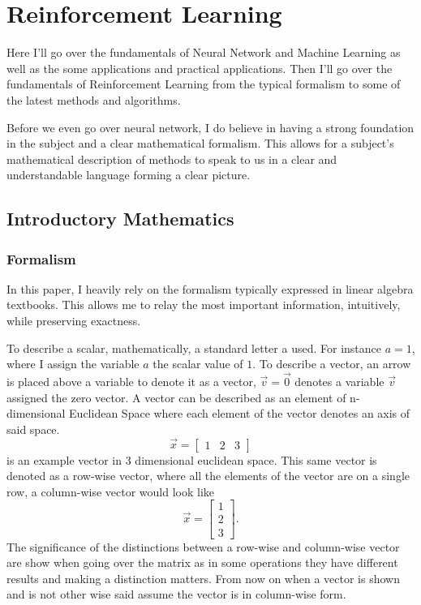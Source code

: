 \chapter{Reinforcement Learning}\label{ch:RL}

Here I'll go over the fundamentals of Neural Network and Machine Learning as well as the some applications and practical applications. Then I'll go over the fundamentals of Reinforcement Learning from the typical formalism to some of the latest methods and algorithms.

Before we even go over neural network, I do believe in having a strong foundation in the subject and a clear mathematical formalism. This allows for a subject's mathematical description of methods to speak to us in a clear and understandable language forming a clear picture.

\section{Introductory Mathematics}

\subsection{Formalism}

In this paper, I heavily rely on the formalism typically expressed in linear algebra textbooks. This allows me to relay the most important information, intuitively, while preserving exactness.

To describe a scalar, mathematically, a standard letter a used. For instance $a=1$, where I assign the variable $a$ the scalar value of $1$. To describe a vector, an arrow is placed above a variable to denote it as a vector, $\vec{v}=\vec{0}$ denotes a variable $\vec{v}$ assigned the zero vector. A vector can be described as an element of n-dimensional Euclidean Space where each element of the vector denotes an axis of said space. $$\vec{x}=\begin{bmatrix}1 & 2 & 3\end{bmatrix}$$ is an example vector in 3 dimensional euclidean space. This same vector is denoted as a row-wise vector, where all the elements of the vector are on a single row, a column-wise vector would look like $$\vec{x}=\begin{bmatrix}1 \\ 2 \\ 3\end{bmatrix}.$$ The significance of the distinctions between a row-wise and column-wise vector are show when going over the matrix as in some operations they have different results and making a distinction matters. From now on when a vector is shown and is not other wise said assume the vector is in column-wise form. 

